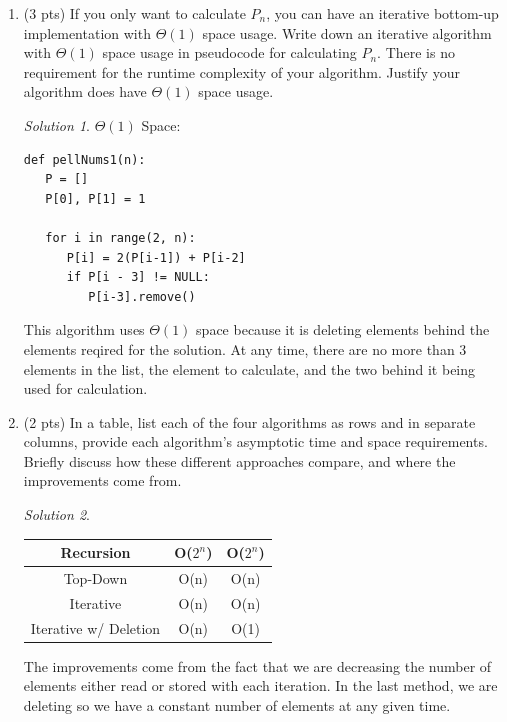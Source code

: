 \documentclass[12pt]{article}
\theoremstyle{remark}
\newtheorem*{solution}{Solution}
\begin{document}
\begin{enumerate}
\begin{enumerate}
\begin{enumerate}
	

	\end{enumerate}

	\pagebreak
	\item \label{q:3:memfid}  (3 pts) If you only want to calculate $P_n$, you can have an iterative bottom-up implementation with $\Theta(1)$ space usage.  Write down an iterative algorithm with $\Theta(1)$ space usage in pseudocode for calculating $P_n$. There is no requirement for the runtime complexity of your algorithm. Justify your algorithm does have $\Theta(1)$ space usage.
    \begin{solution} $\Theta(1)$ Space: \\
\begin{verbatim}
def pellNums1(n):
   P = []
   P[0], P[1] = 1

   for i in range(2, n):
      P[i] = 2(P[i-1]) + P[i-2]
      if P[i - 3] != NULL:
         P[i-3].remove()
\end{verbatim}
This algorithm uses $\Theta(1)$ space because it is deleting elements behind the elements reqired for the solution. At any time, there are no more than 3 elements in the list, the element to calculate, and the two behind it being used for calculation.
    \end{solution}
	
	
	\item (2 pts) In a table, list each of the four algorithms as rows and in separate columns, provide each algorithm's asymptotic time and space requirements. Briefly discuss how these different approaches compare, and where the improvements come from.
	\begin{solution}
\begin{center}
\begin{tabular}{ |c|c|c| } 
 \hline
 Recursion & O($2^n$) & O($2^n$) \\ 
\hline
 Top-Down & O(n) & O(n) \\ 
\hline
 Iterative & O(n) & O(n) \\ 
\hline
 Iterative w/ Deletion & O(n) & O(1) \\ 
 \hline
\end{tabular}
\end{center}
The improvements come from the fact that we are decreasing the number of elements either read or stored with each iteration. In the last method, we are deleting so we have a constant number of elements at any given time.
    \end{solution}


	\end{enumerate}
    \pagebreak


\end{enumerate}
\end{document}
